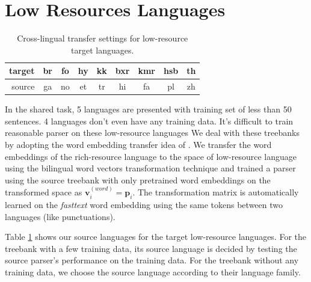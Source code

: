 \documentclass[11pt,a4paper]{article}
\begin{document}
\section{Low Resources Languages}\label{sec:low}
\begin{table}[t]
	\centering
	\small
	\begin{tabular}{r|cccccccc}
		target & br & fo & hy & kk & bxr & kmr & hsb & th \\
		\hline
		source & ga & no & et & tr &  hi & fa & pl & zh \\
	\end{tabular}
\caption{Cross-lingual transfer settings for low-resource target languages.}\label{tbl:low-res-trans}
\end{table}

In the shared task, 5 languages are presented with training set of less than 50 sentences.
4 languages don't even have any training data.
It's difficult to train reasonable parser on these low-resource languages
We deal with these treebanks by adopting the word embedding transfer idea 
of \citet{guo-EtAl:2015:ACL-IJCNLP2}.
We transfer the word embeddings of the rich-resource language
to the space of low-resource language using the bilingual word vectors transformation technique
\cite{DBLP:journals/corr/SmithTHH17}
and trained a parser using the source treebank
with only pretrained word embeddings on the transformed space
as $\mathbf{v}_i^{(word)} = \mathbf{p}_i$.
The transformation matrix is automatically learned on the \textit{fasttext} word embedding
using the same tokens between two languages (like punctuations).

Table \ref{tbl:low-res-trans} shows our source languages for the target low-resource languages.
For the treebank with a few training data, its  source language is decided by
testing the source parser's performance on the training data.
For the treebank without any training data, we choose the source language according to their language family.
\end{document}
